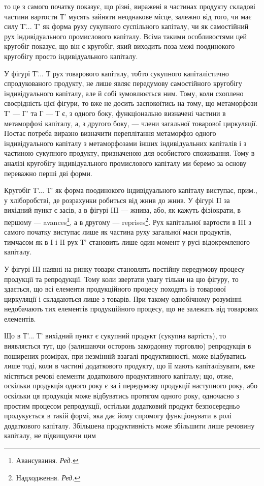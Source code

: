 \parcont{}  %
то це з самого початку показує, що різні, виражені в частинах продукту складові частини вартости Т'
мусять зайняти неоднакове місце, залежно від того, чи має силу Т'... Т' як форма руху сукупного
суспільного капіталу, чи як самостійний рух індивідуального промислового капіталу. Всіма такими
особливостями цей кругобіг показує, що він є кругобіг, який виходить поза межі поодинокого кругобігу
просто індивідуального капіталу.

У фігурі Т'... Т рух товарового капіталу, тобто сукупного капіталістично спродукованого продукту, не
лише являє передумову самостійного кругобігу індивідуального капіталу, але й собі зумовлюється ним.
Тому, коли схоплено своєрідність цієї фігури, то вже не досить заспокоїтись на тому, що метаморфози
Т' — Г' та Г — Т є, з одного боку, функціонально визначені частини в метаморфозі капіталу, а, з
другого боку, — члени загальної товарової циркуляції. Постає потреба виразно визначити переплітання
метаморфоз одного індивідуального капіталу з метаморфозами інших індивідуальних капіталів і з
частиною сукупного продукту, призначеною для особистого споживання. Тому в аналізі кругобігу
індивідуального промислового капіталу ми беремо за основу переважно перші дві форми.

Кругобіг Т'... Т' як форма поодинокого індивідуального капіталу виступає, прим., у хліборобстві, де
розрахунки робиться від жнив до жнив. У фігурі II за вихідний пункт є засів, а в фігурі III — жнива,
або, як кажуть фізіократи, в першому — avances\footnote*{
Авансування. \emph{Ред.}
}, а в другому — reprises\footnote*{
Надходження. \emph{Ред.}
}. Рух капітальної
вартости в III з самого початку виступає лише як частина руху загальної маси продуктів, тимчасом як
в I і II рух Т' становить лише один момент у русі відокремленого капіталу.

У фігурі III наявні на ринку товари становлять постійну передумову процесу продукції та репродукції.
Тому коли звертати увагу тільки на цю фігуру, то здається, що всі елементи продукційного процесу
походять із товарової циркуляції і складаються лише з товарів. При такому однобічному розумінні
недобачають тих елементів продукційного процесу, що не залежать від товарових елементів.

Що в Т'... Т' вихідний пункт є сукупний продукт (сукупна вартість), то виявляється тут, що
(залишаючи осторонь закордонну торговлю) репродукція в поширених розмірах, при незмінній взагалі
продуктивності, може відбуватись лише тоді, коли в частині додаткового продукту, що її мають
капіталізувати, вже містяться речові елементи додаткового продуктивного капіталу; що, отже, оскільки
продукція одного року є за і передумову продукції наступного року, або оскільки ця продукція може
відбуватись протягом одного року, одночасно з простим процесом репродукції, остільки додатковий
продукт безпосередньо продукується в такій формі, яка дає йому спромогу функціонувати в ролі
додаткового капіталу. Збільшена продуктивність може збільшити лише речовину капіталу, не підвищуючи
цим
\parbreak{}  %
